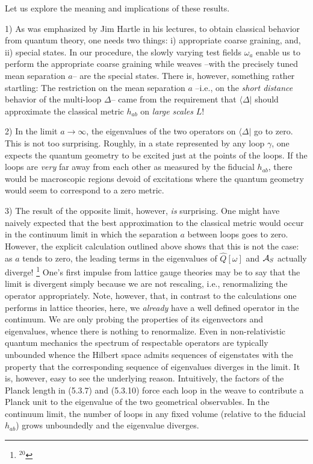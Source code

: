Let us explore the meaning and implications of these results.
\item{1)} {As was emphasized by Jim Hartle in his lectures, to obtain
classical behavior from quantum theory, one needs two things: i) appropriate
coarse graining, and, ii) special states. In our procedure, the slowly varying
test fields $\omega_a$ enable us to perform the appropriate coarse graining
while weaves --with the precisely tuned mean separation $a$-- are the special
states. There is, however, something rather startling: The restriction on the
mean separation $a$ --i.e., on the {\it short distance} behavior of the
multi-loop $\Delta$-- came from the requirement that $\langle\Delta|$ should
approximate the classical metric $h_{ab}$ on {\it large scales} $L$!}
\item{2)} {In the limit $a\to\infty$, the eigenvalues of the two
operators on $\langle\Delta|$ go to zero. This is not too surprising. Roughly,
in a state represented by any loop $\gamma$, one expects the quantum geometry
to be excited just at the points of the loops. If the loops are {\it very}
far away from each other as measured by the fiducial $h_{ab}$, there would
be macroscopic regions devoid of excitations where the quantum geometry
would seem to correspond to a zero metric.}
\item{3)} {The result of the opposite limit,  however, {\it is} surprising.
One might have naively expected that the best approximation to the classical
metric would occur in the continuum limit in which the separation $a$ between
loops goes to zero. However, the explicit calculation outlined above shows
that this is not the case: as $a$ tends to zero, the leading terms in
the eigenvalues of $\hat{Q}[\omega]$ and ${\cal A}_S$ actually diverge!%
\footnote{$^{20}$} {One's first impulse from lattice gauge theories may be to
say that the limit is divergent simply because we are not rescaling, i.e.,
renormalizing the operator appropriately. Note, however, that, in contrast to
the calculations one performs in lattice theories, here, we {\it already}
have a well defined operator in the continuum. We are only probing the
properties of its eigenvectors and eigenvalues, whence there is nothing to
renormalize. Even in non-relativistic quantum mechanics the spectrum of
respectable operators are typically unbounded whence the Hilbert space
admits sequences of eigenstates with the property that the corresponding
sequence of eigenvalues diverges in the limit.}
It is, however, easy to see the underlying reason. Intuitively, the factors
of the Planck length in (5.3.7) and (5.3.10) force each loop in the weave to
contribute a Planck unit to the eigenvalue of the two geometrical observables.
In the continuum limit, the number of loops in any fixed volume
(relative to the fiducial $h_{ab}$) grows unboundedly and the eigenvalue
diverges.}
